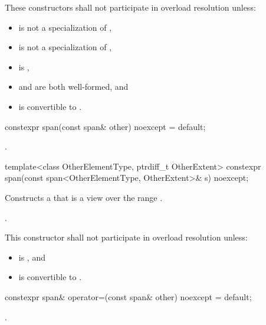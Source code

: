 \begin{codeblock}
\begin{codeblock}
\begin{codeblock}
\begin{itemdescr}
\pnum
\remarks
These constructors shall not participate in overload resolution unless:
\begin{itemize}
\item {} is not a specialization of ,
\item {} is not a specialization of ,
\item {} is ,
\item {} and  are both well-formed, and
\item {} is convertible to .
\end{itemize}
\end{itemdescr}

%
\begin{itemdecl}
constexpr span(const span& other) noexcept = default;
\end{itemdecl}
\begin{itemdescr}
\pnum
\ensures
{}.
\end{itemdescr}

%
\begin{itemdecl}
template<class OtherElementType, ptrdiff_t OtherExtent>
  constexpr span(const span<OtherElementType, OtherExtent>& s) noexcept;
\end{itemdecl}
\begin{itemdescr}
\pnum
\effects
Constructs a  that is a view over the range
.

\pnum
\ensures
{}.

\pnum
\remarks
This constructor shall not participate in overload resolution unless:
\begin{itemize}
\item {} is , and
\item {} is convertible to .
\end{itemize}
\end{itemdescr}

%
\begin{itemdecl}
constexpr span& operator=(const span& other) noexcept = default;
\end{itemdecl}
\begin{itemdescr}
\pnum
\ensures
{}.
\end{itemdescr}


\end{codeblock}
\end{codeblock}
\end{codeblock}
